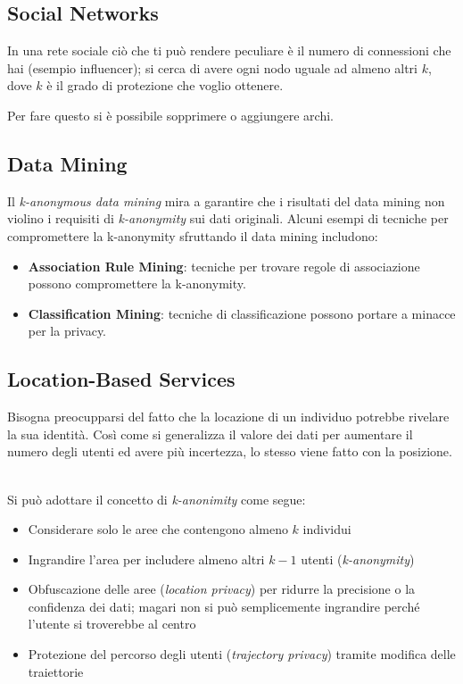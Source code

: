 \documentclass{report}
\begin{document}
\subsection{Social Networks}
In una rete sociale ciò che ti può rendere peculiare è il numero
di connessioni che hai (esempio influencer); si cerca di avere ogni nodo 
uguale ad almeno altri $k$, dove $k$ è il grado di protezione che voglio ottenere.

Per fare questo si è possibile sopprimere o aggiungere archi.


\subsection{Data Mining}
Il \textit{k-anonymous data mining} mira a garantire che i risultati del data mining non violino i requisiti di \textit{k-anonymity} sui dati originali.
Alcuni esempi di tecniche per compromettere la k-anonymity sfruttando il data mining includono:

\begin{itemize}
    \item \textbf{Association Rule Mining}: tecniche per trovare regole di associazione possono compromettere la k-anonymity.
    \item \textbf{Classification Mining}: tecniche di classificazione possono portare a minacce per la privacy.
\end{itemize}

\subsection{Location-Based Services}
Bisogna preocupparsi del fatto che la locazione di un individuo potrebbe 
rivelare la sua identità. Così come si generalizza il valore dei dati per aumentare
il numero degli utenti ed avere più incertezza, lo stesso viene fatto con
la posizione.

\noindent \\Si può adottare il concetto di \textit{k-anonimity} come segue:
\begin{itemize}
    \item Considerare solo le aree che contengono almeno $k$ individui
    \item Ingrandire l'area per includere almeno altri $k-1$ utenti (\textit{k-anonymity})
    \item Obfuscazione delle aree (\textit{location privacy}) per ridurre la precisione o la confidenza dei dati; magari non si può semplicemente ingrandire perché l'utente si troverebbe al centro
    \item Protezione del percorso degli utenti (\textit{trajectory privacy}) tramite modifica delle traiettorie
\end{itemize}
\end{document}
